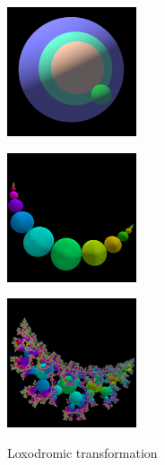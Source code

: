 \begin{figure}[h!tbp]
 \begin{minipage}{0.24\hsize}
  \center
  \includegraphics[width=1.5in, height=1.5in, keepaspectratio]{../img/klein/3diis/loxoGenSimple.pdf}
  \label{fig:loxoGen3d}
 \end{minipage}
 \hspace*{\fill}
 \begin{minipage}{0.24\hsize}
  \center
   \includegraphics[width=1.5in, height=1.5in, keepaspectratio]{../img/klein/3diis/loxoOrbSimple.pdf}
   \label{fig:loxoOrb3d}
 \end{minipage}
 \hspace*{\fill}
 \begin{minipage}{0.24\hsize}
  \center
  \includegraphics[width=1.5in, height=1.5in, keepaspectratio]{../img/klein/3diis/loxoOrbSch.pdf}
  \label{fig:loxoOrbSch3d}
 \end{minipage}
 \caption{Loxodromic transformation}
 \label{fig:loxodromic3d}
\end{figure}

